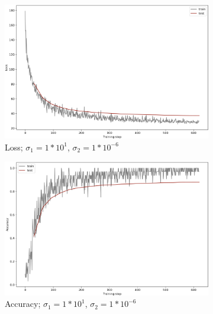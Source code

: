 \begin{figure}[]\ContinuedFloat
    \begin{subfigure}[b]{0.48\textwidth}\ContinuedFloat
         \centering
         \includegraphics[width=\textwidth]{observational/img/bnn/sigmas/LC_s10_s1e-06.png}
         \caption{Loss; $\sigma_1=1*10^{1}$, $\sigma_2=1*10^{-6}$}
     \end{subfigure}
     \hfill
     \begin{subfigure}[b]{0.48\textwidth}
         \centering
         \includegraphics[width=\textwidth]{observational/img/bnn/sigmas/AC_s10_s1e-06.png}
         \caption{Accuracy; $\sigma_1=1*10^{1}$, $\sigma_2=1*10^{-6}$}
     \end{subfigure} 
     \par\bigskip
     \begin{subfigure}[b]{0.48\textwidth}
         \centering

\end{subfigure}
\end{figure}
